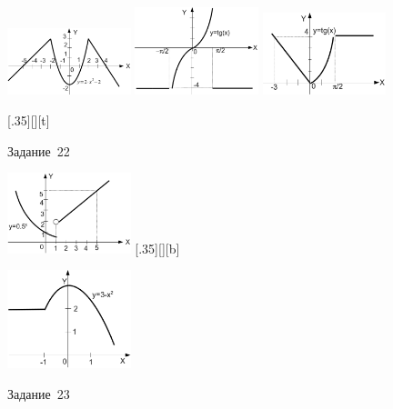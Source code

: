 \begin{figure}%
\begin{floatrow}[3]
{\includegraphics[width=0.32\textwidth,keepaspectratio]{img/ris_3_57}}
{\includegraphics[width=0.32\textwidth,keepaspectratio]{img/ris_3_58}}
{\includegraphics[width=0.32\textwidth,keepaspectratio]{img/ris_3_59}}
\end{floatrow}
\end{figure}%

\begin{figure}[h]
\begin{floatrow}
[.35\textwidth][\FBheight][t]
{\caption{Задание~22}
\label{ch03:refDrawing59}}
{\includegraphics[width=0.32\textwidth,keepaspectratio]{img/ris_3_60}}%
%
[.35\textwidth][\FBheight][b]
{\caption{Задание~23}
\label{ch03:refDrawing60}}
{\includegraphics[width=0.32\textwidth]{img/ris_3_61}}
\end{floatrow}
\end{figure}

